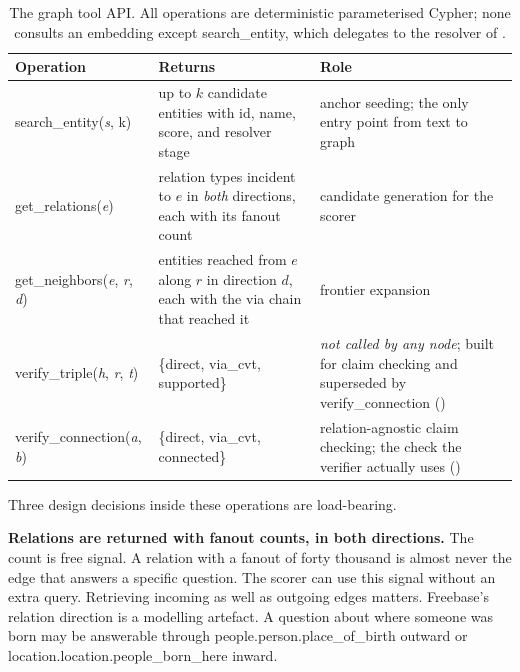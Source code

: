 \begin{table}[!tb]
  \begin{center}
    \caption[The graph tool API]{The graph tool API. All operations are
    deterministic parameterised Cypher; none consults an embedding except
    \textsf{search\_entity}, which delegates to the resolver of
    .}
    \label{tab:tools}
    \footnotesize
    \begin{tabular}{|l|L{47mm}|L{47mm}|}
      \hline
      \textbf{Operation} & \textbf{Returns} & \textbf{Role} \\
      \hline
      \textsf{search\_entity(\textit{s}, k)} & up to $k$ candidate entities with
      id, name, score, and resolver stage & anchor seeding; the only entry point
      from text to graph \\
      \hline
      \textsf{get\_relations(\textit{e})} & relation types incident to $e$ in
      \emph{both} directions, each with its fanout count & candidate generation
      for the scorer \\
      \hline
      \textsf{get\_neighbors(\textit{e}, \textit{r}, \textit{d})} & entities
      reached from $e$ along $r$ in direction $d$, each with the \textsf{via}
      chain that reached it & frontier expansion \\
      \hline
      \textsf{verify\_triple(\textit{h}, \textit{r}, \textit{t})} &
      \textsf{\{direct, via\_cvt, supported\}} & \emph{not called by any node};
      built for claim checking and superseded by \textsf{verify\_connection}
      () \\
      \hline
      \textsf{verify\_connection(\textit{a}, \textit{b})} & \textsf{\{direct,
      via\_cvt, connected\}} & relation-agnostic claim checking; the check the
      verifier actually uses () \\
      \hline
    \end{tabular}
  \end{center}
\end{table}

Three design decisions inside these operations are load-bearing.

\textbf{Relations are returned with fanout counts, in both directions.} The
count is free signal. A relation with a fanout of forty thousand is almost never
the edge that answers a specific question. The scorer can use this signal
without an extra query. Retrieving incoming as well as outgoing edges matters.
Freebase's relation direction is a modelling artefact. A question about where
someone was born may be answerable through
\textsf{people.person.place\_of\_birth} outward or
\textsf{location.location.people\_born\_here} inward.

